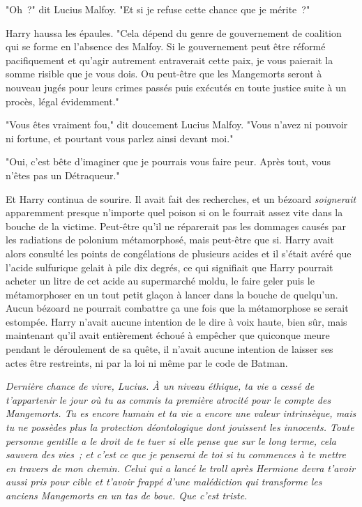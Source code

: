 "Oh~?" dit Lucius Malfoy. "Et si je refuse cette chance que je mérite~?"

Harry haussa les épaules. "Cela dépend du genre de gouvernement de coalition qui se forme en l'absence des Malfoy. Si le gouvernement peut être réformé pacifiquement et qu'agir autrement entraverait cette paix, je vous paierait la somme risible que je vous dois. Ou peut-être que les Mangemorts seront à nouveau jugés pour leurs crimes passés puis exécutés en toute justice suite à un procès, légal évidemment."

"Vous êtes vraiment fou," dit doucement Lucius Malfoy. "Vous n'avez ni pouvoir ni fortune, et pourtant vous parlez ainsi devant moi."

"Oui, c'est bête d'imaginer que je pourrais vous faire peur. Après tout, vous n'êtes pas un Détraqueur."

Et Harry continua de sourire. Il avait fait des recherches, et un bézoard \emph{soignerait} apparemment presque n'importe quel poison si on le fourrait assez vite dans la bouche de la victime. Peut-être qu'il ne réparerait pas les dommages causés par les radiations de polonium métamorphosé, mais peut-être que si. Harry avait alors consulté les points de congélations de plusieurs acides et il s'était avéré que l'acide sulfurique gelait à pile dix degrés, ce qui signifiait que Harry pourrait acheter un litre de cet acide au supermarché moldu, le faire geler puis le métamorphoser en un tout petit glaçon à lancer dans la bouche de quelqu'un. Aucun bézoard ne pourrait combattre ça une fois que la métamorphose se serait estompée. Harry n'avait aucune intention de le dire à voix haute, bien sûr, mais maintenant qu'il avait entièrement échoué à empêcher que quiconque meure pendant le déroulement de sa quête, il n'avait aucune intention de laisser ses actes être restreints, ni par la loi ni même par le code de Batman.

\emph{Dernière chance de vivre, Lucius. À un niveau éthique, ta vie a cessé de t'appartenir le jour où tu as commis ta première atrocité pour le compte des Mangemorts. Tu es encore humain et ta vie a encore une valeur intrinsèque, mais tu ne possèdes plus la protection déontologique dont jouissent les innocents. Toute personne gentille a le droit de te tuer si elle pense que sur le long terme, cela sauvera des vies~; et c'est ce que je penserai de toi si tu commences à te mettre en travers de mon chemin. Celui qui a lancé le troll après Hermione devra t'avoir aussi pris pour cible et t'avoir frappé d'une malédiction qui transforme les anciens Mangemorts en un tas de boue. Que c'est triste.}

